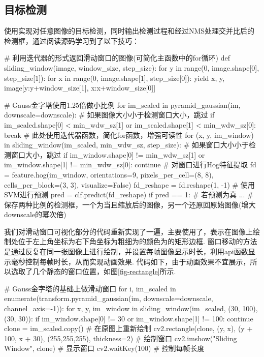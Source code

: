 \documentclass[12pt, a4paper, oneside]{ctexart}
\numberwithin{equation}{section}  %
\begin{document}
\subsection{目标检测}
使用实现对任意图像的目标检测，同时输出检测过程和经过NMS处理交并比后的检测框，通过阅读源码学习到了以下技巧：
\begin{pythoncode}
# 利用迭代器的形式返回滑动窗口的图像(可简化主函数中的for循环)
def sliding_window(image, window_size, step_size):
    for y in range(0, image.shape[0], step_size[1]):
        for x in range(0, image.shape[1], step_size[0]):
            yield x, y, image[y:y+window_size[1], x:x+window_size[0]]

    # Gauss金字塔使用1.25倍做小比例
    for im_scaled in pyramid_gaussian(im, downscale=downscale):
        # 如果图像大小小于检测窗口大小，跳过
        if im_scaled.shape[0] < min_wdw_sz[1] or im_scaled.shape[1] < min_wdw_sz[0]:
            break
        # 此处使用迭代器函数，简化for函数，增强可读性
        for (x, y, im_window) in sliding_window(im_scaled, min_wdw_sz, step_size):
            # 如果窗口大小小于检测窗口大小，跳过
            if im_window.shape[0] != min_wdw_sz[1] or im_window.shape[1] != min_wdw_sz[0]:
                continue
            # 对窗口进行Hog特征提取
            fd = feature.hog(im_window, orientations=9, pixels_per_cell=(8, 8), cells_per_block=(3, 3), visualize=False)
            fd_reshape = fd.reshape(1, -1)
            # 使用SVM进行预测
            pred = clf.predict(fd_reshape)
        if pred == 1:  # 若预测为真
            ... # 保存两种比例的检测框，一个为当且缩放后的图像，另一个还原回原始图像(增大downscale的幂次倍)
\end{pythoncode}
我们对滑动窗口可视化部分的代码重新实现了一遍，主要使用了，表示在图像上绘制处位于左上角坐标为右下角坐标为粗细为的颜色为的矩形边框. 窗口移动的方法是通过反复在同一张图像上进行绘制，并设置每帧图像显示时长，利用api函数显示毫秒控制每帧时长，从而实现动画效果. 代码如下，由于动画效果不宜展示，所以选取了几个静态的窗口位置，如图\ref{fig-rectangle}所示.
\begin{pythoncode}
# Gauss金字塔的基础上做滑动窗口
for i, im_scaled in enumerate(transform.pyramid_gaussian(im, downscale=downscale, channel_axis=-1)):
    for x, y, im_window in sliding_window(im_scaled, (30, 100), (30, 30)):
        if im_window.shape[0] != 30 or im_window.shape[1] != 100:
            continue
        clone = im_scaled.copy()  # 在原图上重新绘制
        cv2.rectangle(clone, (y, x), (y + 100, x + 30), (255,255,255), thickness=2)  # 绘制窗口
        cv2.imshow("Sliding Window", clone)  # 显示窗口
        cv2.waitKey(100)  # 控制每帧长度
\end{pythoncode}
\end{document}
